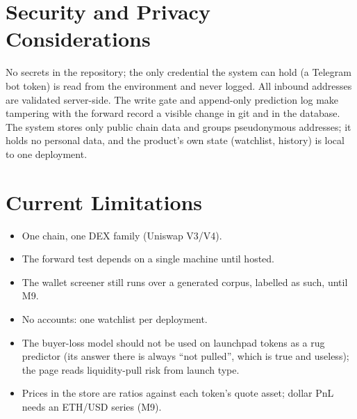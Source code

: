 \section{Security and Privacy Considerations}
No secrets in the repository; the only credential the system can hold (a Telegram bot token) is read from the environment and never logged. All inbound addresses are validated server-side. The write gate and append-only prediction log make tampering with the forward record a visible change in git and in the database. The system stores only public chain data and groups pseudonymous addresses; it holds no personal data, and the product's own state (watchlist, history) is local to one deployment.

\section{Current Limitations}
\begin{itemize}
  \item One chain, one DEX family (Uniswap V3/V4).
  \item The forward test depends on a single machine until hosted.
  \item The wallet screener still runs over a generated corpus, labelled as such, until M9.
  \item No accounts: one watchlist per deployment.
  \item The buyer-loss model should not be used on launchpad tokens as a rug predictor (its answer there is always ``not pulled'', which is true and useless); the page reads liquidity-pull risk from launch type.
  \item Prices in the store are ratios against each token's quote asset; dollar PnL needs an ETH/USD series (M9).
\end{itemize}
